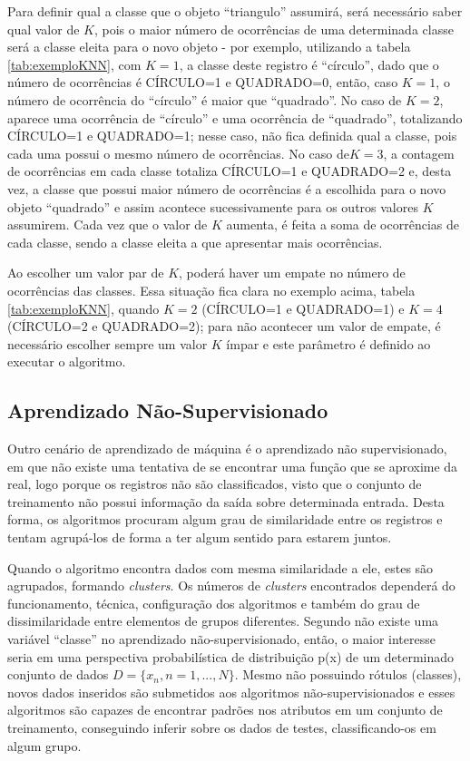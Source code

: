  
Para definir qual a classe que o objeto ``triangulo'' assumirá, será necessário saber qual valor de ${K}$, pois o maior número de ocorrências de uma determinada classe será a classe eleita para o novo objeto - por exemplo, utilizando a tabela \ref{tab:exemploKNN}, com ${K=1}$, a classe deste registro é “círculo”, dado que o número de ocorrências é CÍRCULO=1 e QUADRADO=0, então, caso ${K=1}$, o número de ocorrência do “círculo” é maior que ``quadrado''. No caso de ${K=2}$, aparece uma ocorrência de “círculo” e uma ocorrência de “quadrado”, totalizando CÍRCULO=1 e QUADRADO=1; nesse caso, não fica definida qual a classe, pois cada uma possui o mesmo número de ocorrências. No caso de${K=3}$, a contagem de ocorrências em cada classe totaliza CÍRCULO=1 e QUADRADO=2 e, desta vez, a classe que possui maior número de ocorrências é a escolhida para o novo objeto ``quadrado'' e assim acontece sucessivamente para os outros valores ${K}$ assumirem. Cada vez que o valor de ${K}$ aumenta, é feita a soma de ocorrências de cada classe, sendo a classe eleita a que apresentar mais ocorrências. 
 

Ao escolher um valor par de ${K}$, poderá haver um empate no número de ocorrências das classes. Essa situação fica clara no exemplo acima, tabela \ref{tab:exemploKNN}, quando ${K=2}$  (CÍRCULO=1 e QUADRADO=1) e ${K=4}$  (CÍRCULO=2 e QUADRADO=2); para não acontecer um valor de empate, é necessário escolher sempre um valor ${K}$ ímpar e este parâmetro é definido ao executar o algoritmo. 

\subsection{Aprendizado Não-Supervisionado}\label{ssec:aprendNSup}

Outro cenário de aprendizado de máquina é o aprendizado não supervisionado, em que não existe uma tentativa de se encontrar uma função que se aproxime da real, logo porque os registros não são classificados, visto que o conjunto de treinamento não possui informação da saída sobre determinada entrada. Desta forma, os algoritmos procuram algum grau de similaridade entre os registros e tentam agrupá-los de forma a ter algum sentido para estarem juntos.

Quando o algoritmo encontra dados com mesma similaridade a ele, estes são agrupados, formando \textit{clusters}. Os números de \textit{clusters} encontrados dependerá do funcionamento, técnica, configuração dos algoritmos e também do grau de dissimilaridade entre elementos de grupos diferentes. Segundo \cite{Barber2011} não existe uma variável “classe” no aprendizado não-supervisionado, então, o maior interesse seria em uma perspectiva probabilística de distribuição p(x) de um determinado conjunto de dados ${D = \{x_{n},n=1,...,N\}}$. Mesmo não possuindo rótulos (classes), novos dados inseridos são submetidos aos algoritmos não-supervisionados e esses algoritmos são capazes de encontrar padrões nos atributos em um conjunto de treinamento, conseguindo inferir sobre os dados de testes, classificando-os em algum grupo.

